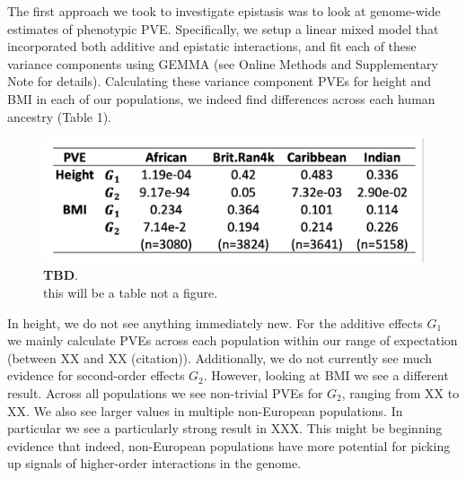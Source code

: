 \documentclass[12pt, a4paper]{article}
\begin{document}
The first approach we took to investigate epistasis was to look at genome-wide estimates of phenotypic PVE. Specifically, we setup a linear mixed model that incorporated both additive and epistatic interactions, and fit each of these variance components using GEMMA \citep{Zhou2012} (see Online Methods and Supplementary Note for details). Calculating these variance component PVEs for height and BMI in each of our populations, we indeed find differences across each human ancestry (Table 1).

\begin{figure}[ht]
\centering
\includegraphics[scale=1]{Images/Table1_Placeholder.png}
\caption[TBD]{\textbf{TBD}. \\ this will be a table not a figure.}
\label{IntrePath-Main-Table-GEMMA}
\end{figure}

In height, we do not see anything immediately new. For the additive effects $G_1$ we mainly calculate PVEs across each population within our range of expectation (between XX and XX (citation)). Additionally, we do not currently see much evidence for second-order effects $G_2$. However, looking at BMI we see a different result. Across all populations we see non-trivial PVEs for $G_2$, ranging from XX to XX. We also see larger values in multiple non-European populations. In particular we see a particularly strong result in XXX. This might be beginning evidence that indeed, non-European populations have more potential for picking up signals of higher-order interactions in the genome.   

\fi
\end{document}
